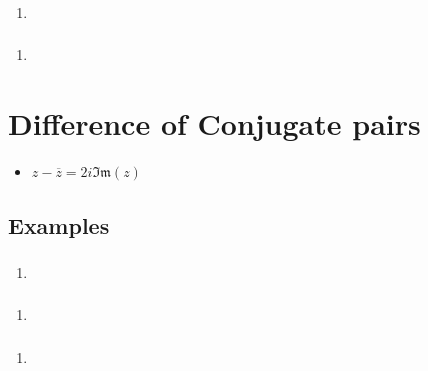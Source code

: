 \documentclass{report}
\newcommand{\im}[1]{\mathfrak{Im}(#1)}
\newcommand{\conjugate}[1]{\overline{#1}}
\begin{document}
                \subsubsection{}
                    \begin{enumerate}
                        \item 
                    \end{enumerate}
                \subsubsection{}
                    \begin{enumerate}
                        \item 
                    \end{enumerate}
        \section{Difference of Conjugate pairs}
            \begin{itemize}
                \item $z-\conjugate{z}=2i\im{z}$
            \end{itemize}
            \subsection{Examples}
                \subsubsection{}
                    \begin{enumerate}
                        \item 
                    \end{enumerate}
                \subsubsection{}
                    \begin{enumerate}
                        \item 
                    \end{enumerate}
                \subsubsection{}
                    \begin{enumerate}
                        \item 
                    \end{enumerate}
\end{document}
